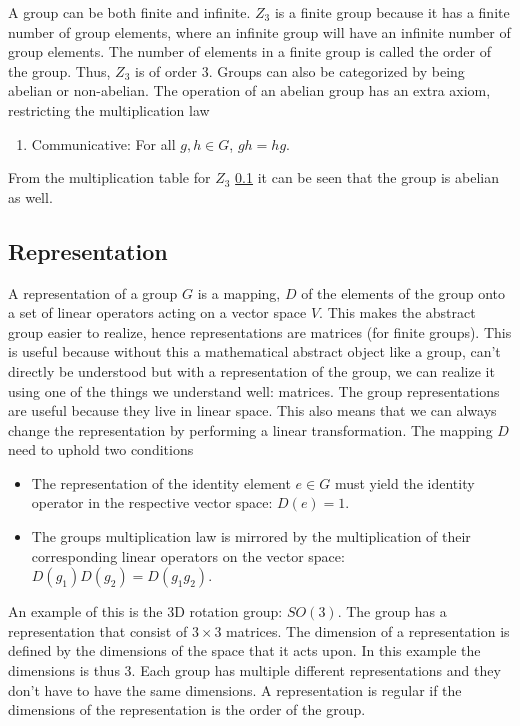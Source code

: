 A group can be both finite and infinite. $Z_3$ is a finite group because it has a finite number of group elements, where an infinite group will have an infinite number of group elements. The number of elements in a finite group is called the order of the group. Thus, $Z_3$ is of order $3$. Groups can also be categorized by being abelian or non-abelian. The operation of an abelian group has an extra axiom, restricting the multiplication law
\begin{enumerate}
    \item Communicative: For all $g,h\in G$, $gh=hg$.
\end{enumerate}
From the multiplication table for $Z_3$ \ref{} it can be seen that the group is abelian as well. 

\subsection{Representation}
A representation of a group $G$ is a mapping, $D$ of the elements of the group onto a set of linear operators acting on a vector space $V$. This makes the abstract group easier to realize, hence representations are matrices (for finite groups). This is useful because without this a mathematical abstract object like a group, can't directly be understood but with a representation of the group, we can realize it using one of the things we understand well: matrices. The group representations are useful because they live in linear space. This also means that we can always change the representation by performing a linear transformation. The mapping $D$ need to uphold two conditions
\begin{itemize}
    \item The representation of the identity element $e\in G$ must yield the identity operator in the respective vector space: $D(e)=1$. 
    \item The groups multiplication law is mirrored by the multiplication of their corresponding linear operators on the vector space: $D(g_1)D(g_2)=D(g_1g_2)$.
\end{itemize}
An example of this is the 3D rotation group: $SO(3)$. The group has a representation that consist of $3\times 3$ matrices. The dimension of a representation is defined by the dimensions of the space that it acts upon. In this example the dimensions is thus $3$. Each group has multiple different representations and they don't have to have the same dimensions. A representation is regular if the dimensions of the representation is the order of the group. 

